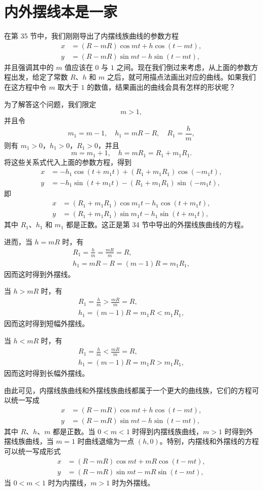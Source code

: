 \section{内外摆线本是一家}

在第 35 节中，我们刚刚导出了内摆线族曲线的参数方程
\begin{align*}
  x &= (R-mR)\cos mt + h\cos(t-mt), \\
  y &= (R-mR)\sin mt - h\sin(t-mt),
\end{align*}
并且强调其中的 $m$ 值应该在 $0$ 与 $1$ 之间。现在我们倒过来考虑，从上面的参数方程出发，给定了常数 $R$、$h$ 和 $m$ 之后，就可用描点法画出对应的曲线。如果我们在这方程中令 $m$ 取大于 $1$ 的数值，结果画出的曲线会具有怎样的形状呢？

为了解答这个问题，我们限定
\[
  m > 1,
\]
并且令
\[
  m_1 = m - 1,\quad h_1 = mR - R,\quad R_1 = \frac{h}{m},
\]
则有 $m_1 > 0$，$h_1 > 0$，$R_1 > 0$，并且
\[
  m = m_1 + 1,\quad h = mR_1 = R_1 + m_1R_1.
\]
将这些关系式代入上面的参数方程，得到
\begin{align*}
  x &= -h_1\cos(t + m_1t) + (R_1 + m_1R_1)\cos(-m_1t), \\
  y &= -h_1\sin(t + m_1t) - (R_1 + m_1R_1)\sin(-m_1t),
\end{align*}
即
\begin{align*}
  x &= (R_1 + m_1R_1)\cos m_1t - h_1\cos(t + m_1t), \\
  y &= (R_1 + m_1R_1)\sin m_1t - h_1\sin(t + m_1t),
\end{align*}
其中 $R_1$、$h_1$ 和 $m_1$ 都是正数。这正是第 34 节中导出的外摆线族曲线的方程。

进而，当 $h = mR$ 时，有
\begin{gather*}
  R_1 = \frac{h}{m} = \frac{mR}{m} = R, \\
  h_1 = mR - R = (m-1)R = m_1R_1,
\end{gather*}
因而这时得到外摆线。

当 $h > mR$ 时，有
\begin{gather*}
  R_1 = \frac{h}{m} > \frac{mR}{m} = R, \\
  h_1 = (m-1)R = m_1R < m_1R_1,
\end{gather*}
因而这时得到短幅外摆线。

当 $h < mR$ 时，有
\begin{gather*}
  R_1 = \frac{h}{m} < \frac{mR}{m} = R, \\
  h_1 = (m-1)R = m_1R > m_1R_1,
\end{gather*}
因而这时得到长幅外摆线。

由此可见，内摆线族曲线和外摆线族曲线都属于一个更大的曲线族，它们的方程可以统一写成
\begin{align*}
  x &= (R-mR)\cos mt + h\cos(t-mt), \\
  y &= (R-mR)\sin mt - h\sin(t-mt),
\end{align*}
其中 $R$、$h$、$m$ 都是正数。当 $0 < m < 1$ 时得到内摆线族曲线，$m > 1$ 时得到外摆线族曲线，当 $m = 1$ 时曲线退缩为一点 $(h, 0)$。特别，内摆线和外摆线的方程可以统一写成形式
\begin{align*}
  x &= (R-mR)\cos mt + mR\cos(t-mt), \\
  y &= (R-mR)\sin mt - mR\sin(t-mt),
\end{align*}
当 $0 < m < 1$ 时为内摆线，$m > 1$ 时为外摆线。
